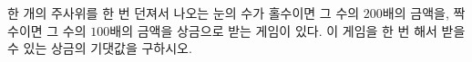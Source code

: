 한 개의 주사위를 한 번 던져서 나오는 눈의 수가 홀수이면 그 수의 $200$배의 금액을, 짝수이면 그 수의 $100$배의 금액을 상금으로 받는 게임이 있다. 이 게임을 한 번 해서 받을 수 있는 상금의 기댓값을 구하시오.
